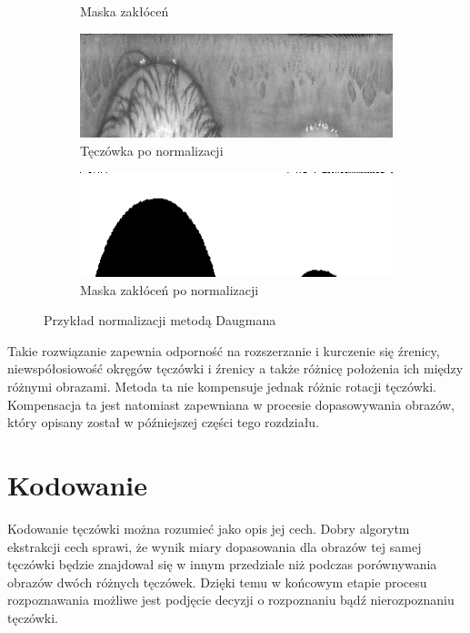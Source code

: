 \documentclass[10pt,polish,a4paper,oneside]{ppfcmthesis}
\begin{document}
\begin{figure}[ht]
\begin{subfigure}[b]{0.35\textwidth}
    \caption{Maska zakłóceń}
  \end{subfigure}
  \begin{subfigure}[b]{0.35\textwidth}
    \includegraphics[width=\textwidth]{images/normalization/irisNormalized.png}
    \caption{Tęczówka po normalizacji}
  \end{subfigure}
  \begin{subfigure}[b]{0.35\textwidth}
    \includegraphics[width=\textwidth]{images/normalization/maskNormalized.png}
    \caption{Maska zakłóceń po normalizacji}
  \end{subfigure}
  \caption{Przykład normalizacji metodą Daugmana}
  \label{fig:normalizationExample}
\end{figure}

Takie rozwiązanie zapewnia odpornoś\'c na rozszerzanie i kurczenie się \'zrenicy, niewspółosiowoś\'c
okręgów tęczówki i \'zrenicy a także różnicę położenia ich między różnymi obrazami. Metoda ta nie
kompensuje jednak różnic rotacji tęczówki. Kompensacja ta jest natomiast zapewniana w procesie
dopasowywania obrazów, który opisany został w pó\'zniejszej części tego rozdziału.

\section{Kodowanie}

Kodowanie tęczówki można rozumie\'c jako opis jej cech.
Dobry algorytm ekstrakcji cech sprawi, że wynik miary dopasowania dla obrazów tej samej tęczówki
będzie znajdował się w innym przedziale niż podczas porównywania obrazów dwóch
różnych tęczówek. Dzięki temu w końcowym etapie procesu rozpoznawania możliwe jest podjęcie decyzji
o rozpoznaniu bąd\'z nierozpoznaniu tęczówki.
\end{document}
